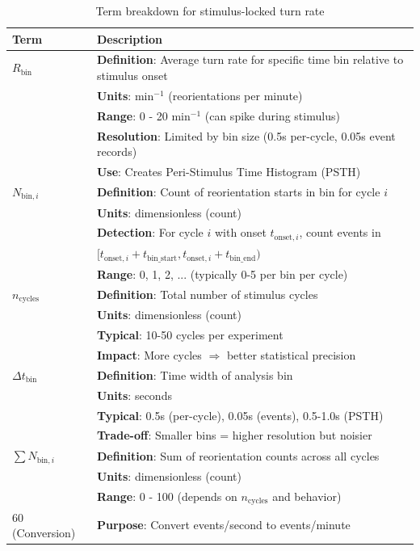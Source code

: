 \documentclass[
  11pt,
]{article}
\begin{document}
\begin{table}[H]
\centering
\footnotesize
\begin{tabular}{p{3cm}p{11cm}}
\hline
\textbf{Term} & \textbf{Description} \\
\hline
$R_{\text{bin}}$ & \textbf{Definition}: Average turn rate for specific time bin relative to stimulus onset \\
 & \textbf{Units}: min$^{-1}$ (reorientations per minute) \\
 & \textbf{Range}: 0 - 20 min$^{-1}$ (can spike during stimulus) \\
 & \textbf{Resolution}: Limited by bin size (0.5s per-cycle, 0.05s event records) \\
 & \textbf{Use}: Creates Peri-Stimulus Time Histogram (PSTH) \\
\hline
$N_{\text{bin},i}$ & \textbf{Definition}: Count of reorientation starts in bin for cycle $i$ \\
 & \textbf{Units}: dimensionless (count) \\
 & \textbf{Detection}: For cycle $i$ with onset $t_{\text{onset},i}$, count events in \\
 & \quad $[t_{\text{onset},i} + t_{\text{bin\_start}}, t_{\text{onset},i} + t_{\text{bin\_end}})$ \\
 & \textbf{Range}: 0, 1, 2, ... (typically 0-5 per bin per cycle) \\
\hline
$n_{\text{cycles}}$ & \textbf{Definition}: Total number of stimulus cycles \\
 & \textbf{Units}: dimensionless (count) \\
 & \textbf{Typical}: 10-50 cycles per experiment \\
 & \textbf{Impact}: More cycles $\Rightarrow$ better statistical precision \\
\hline
$\Delta t_{\text{bin}}$ & \textbf{Definition}: Time width of analysis bin \\
 & \textbf{Units}: seconds \\
 & \textbf{Typical}: 0.5s (per-cycle), 0.05s (events), 0.5-1.0s (PSTH) \\
 & \textbf{Trade-off}: Smaller bins = higher resolution but noisier \\
\hline
$\sum N_{\text{bin},i}$ & \textbf{Definition}: Sum of reorientation counts across all cycles \\
 & \textbf{Units}: dimensionless (count) \\
 & \textbf{Range}: 0 - 100 (depends on $n_{\text{cycles}}$ and behavior) \\
\hline
60 (Conversion) & \textbf{Purpose}: Convert events/second to events/minute \\
\hline
\end{tabular}
\caption{Term breakdown for stimulus-locked turn rate}

\end{table}
\end{document}
